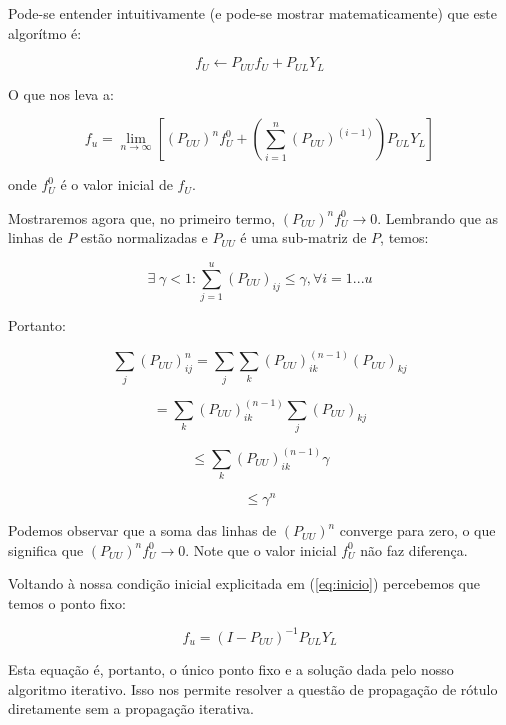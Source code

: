 \documentclass[12pt]{article}
\begin{document}
Pode-se entender intuitivamente (e pode-se mostrar matematicamente) que este algorítmo é:

\begin{equation} \label{eq:inicio}
  f_U \leftarrow P_{UU}f_U + P_{UL}Y_L
\end{equation}

O que nos leva a:

\begin{equation}
  f_u = \lim_{n \rightarrow \infty}[(P_{UU})^n f_U^0 + (\sum_{i=1}^{n}(P_{UU})^{(i-1)})P_{UL}Y_L]
\end{equation}

onde $f_U^0$ é o valor inicial de $f_U$.

Mostraremos agora que, no primeiro termo, $(P_{UU})^n f_U^0 \rightarrow 0$. Lembrando que as linhas de $P$ estão normalizadas e $P_{UU}$ é uma sub-matriz de $P$, temos:

\begin{equation}
  \exists \; \gamma < 1 : \sum_{j = 1}^u(P_{UU})_{ij} \leq \gamma, \forall i = 1...u
\end{equation}

Portanto:

\begin{equation}
  \sum_j(P_{UU})_{ij}^n = \sum_j\sum_k(P_{UU})_{ik}^{(n-1)}(P_{UU})_{kj}
\end{equation}

\begin{equation}
  = \sum_k(P_{UU})_{ik}^{(n-1)}\sum_j(P_{UU})_{kj}
\end{equation}

\begin{equation}
  \leq \sum_k(P_{UU})_{ik}^{(n-1)}\gamma
\end{equation}

\begin{equation}
  \leq \gamma^n
\end{equation}

Podemos observar que a soma das linhas de $(P_{UU})^n$ converge para zero, o que significa que $(P_{UU})^nf_U^0 \rightarrow 0$. Note que o valor inicial $f_U^0$ não faz diferença.

Voltando à nossa condição inicial explicitada em (\ref{eq:inicio}) percebemos que temos o ponto fixo:

\begin{equation}
  f_u = (I - P_{UU})^{-1}P_{UL}Y_{L}
\end{equation}

Esta equação é, portanto, o único ponto fixo e a solução dada pelo nosso algoritmo iterativo. Isso nos permite resolver a questão de propagação de rótulo diretamente sem a propagação iterativa. 
\end{document}
